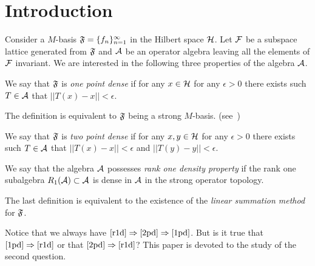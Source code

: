 \documentclass[12pt]{amsart}
\begin{document}
\section{Introduction}
  Consider a $M$-basis $\fsys = \seq{f}$ in the Hilbert space $\cal{H}$.
  Let $\cal{F}$ be a subspace lattice generated from $\fsys$ and $\cal{A}$ be an operator algebra leaving all the elements of
    $\cal{F}$ invariant.
  We are interested in the following three properties of the algebra $\cal{A}$.
  \begin{definition}
    \label{1pd}
    We say that $\fsys$ is \emph{one point dense} if for any $x \in \cal{H}$ for any $\epsilon > 0$
      there exists such $T\in \cal{A}$ that $||T(x) - x|| < \epsilon$.

  \end{definition}
  \begin{note}
    The definition is equivalent to $\fsys$ being a strong $M$-basis. (see~\cite{katavolos})
  \end{note}
  \begin{definition}
    \label{2pd}
    We say that $\fsys$ is \emph{two point dense} if for any $x, y \in \cal{H}$ for any $\epsilon > 0$
      there exists such $T\in \cal{A}$ that $||T(x) - x|| < \epsilon$ and $||T(y) - y|| < \epsilon$.
  \end{definition}
  \begin{definition}
    \label{r1d}
    We say that the algebra $\cal{A}$ possesses \emph{rank one density property} if
      the rank one subalgebra $R_1(\cal{A}) \subset \cal{A}$ is dense in $\cal{A}$ in the strong operator topology.
  \end{definition}
  \begin{note}
    The last definition is equivalent to the existence of the \emph{linear summation method} for $\fsys$.
  \end{note}
  Notice that we always have $\ref{r1d} \Rightarrow \ref{2pd} \Rightarrow \ref{1pd}$.
  But is it true that $\ref{1pd} \Rightarrow \ref{r1d}$ or that $\ref{2pd} \Rightarrow \ref{r1d}$?
  This paper is devoted to the study of the second question.
\end{document}
